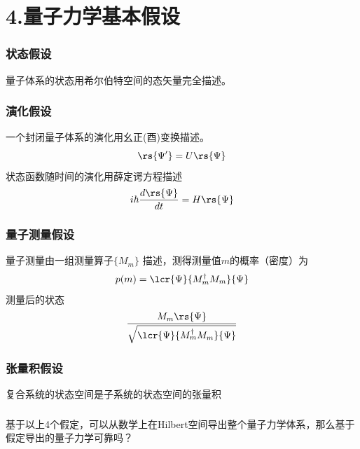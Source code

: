 \section{4.量子力学基本假设}

\begin{frame}
    \frametitle{状态假设}
    \begin{tcolorbox4}[1. 状态假设]
    量子体系的状态用希尔伯特空间的态矢量完全描述。
    \end{tcolorbox4}
\end{frame}


\begin{frame}
    \frametitle{演化假设}
    \begin{tcolorbox4}[2. 演化假设]
    一个封闭量子体系的演化用幺正(酉)变换描述。
    \[\rs{\Psi'}=U\rs{\Psi}\]
    状态函数随时间的演化用薛定谔方程描述
    \[ i\hbar \frac{d\rs{\Psi}}{dt}=H \rs{\Psi}\]
    \end{tcolorbox4}
\end{frame}


\begin{frame}
    \frametitle{量子测量假设}
    \begin{tcolorbox4}[3. 量子测量假设]
    量子测量由一组测量算子$\{ M_m\}$ 描述，测得测量值$m$的概率（密度）为
    \[ p(m)=\lcr{\Psi}{M_m ^\dagger M_m}{\Psi} 
     \]
     测量后的状态 \[\frac{M_m\rs{\Psi}}{\sqrt{\lcr{\Psi}{M_m ^\dagger M_m}{\Psi}}}\]
    \end{tcolorbox4}
\end{frame}

\begin{frame}
    \frametitle{张量积假设}
    \begin{tcolorbox4}[4. 复合系统假设]
    复合系统的状态空间是子系统的状态空间的张量积
    \end{tcolorbox4}
\end{frame}

\begin{frame}
    \frametitle{}
    \begin{tcolorbox3}[学术讨论]
        基于以上4个假定，可以从数学上在Hilbert空间导出整个量子力学体系，那么基于假定导出的量子力学可靠吗？
    \end{tcolorbox3}
\end{frame}